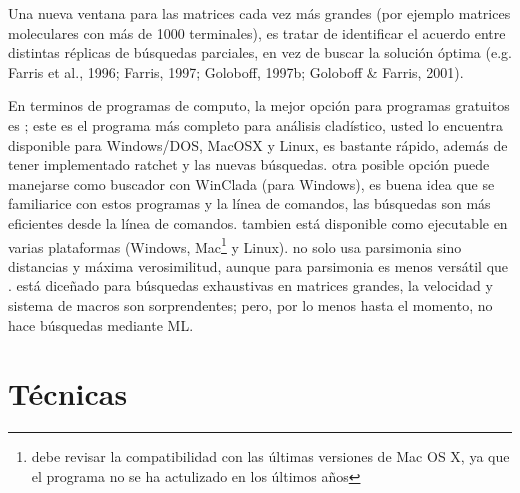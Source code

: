 Una nueva ventana para las matrices cada vez m\'as grandes (por ejemplo matrices moleculares con m\'as de 1000 terminales),  es tratar de identificar el acuerdo entre distintas r\'eplicas de b\'usquedas parciales,  en vez de buscar la soluci\'on \'optima {\color{red}(e.g. Farris et al.,  1996; Farris,  1997; Goloboff,  1997b; Goloboff \& Farris,  2001)}. 

En terminos de programas de computo,  la mejor opci\'on para programas gratuitos es ; este es el programa m\'as  completo para an\'alisis clad\'istico,  usted lo encuentra disponible para Windows/DOS,  MacOSX y Linux,   es bastante r\'apido,   adem\'as de tener implementado ratchet y las nuevas b\'usquedas.   otra posible opci\'on puede manejarse como buscador con WinClada (para Windows),  es buena idea que se familiarice con estos programas y la l\'inea de comandos, las b\'usquedas son m\'as eficientes desde la l\'inea de comandos.   tambien est\'a disponible como ejecutable en varias plataformas (Windows,  Mac\footnote{debe revisar la compatibilidad con las \'ultimas versiones de Mac OS X, ya que el programa no se ha actulizado en los \'ultimos a\~nos} y Linux).    no solo usa parsimonia sino distancias y m\'axima verosimilitud, aunque para parsimonia es menos vers\'atil que .   est\'a dice\~nado para b\'usquedas exhaustivas en matrices grandes, la velocidad y sistema de macros son sorprendentes; pero,  por lo menos hasta el momento, no hace b\'usquedas mediante ML.


\section*{T\'ecnicas}

